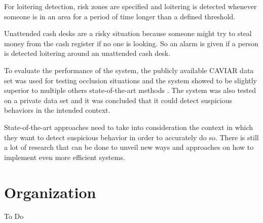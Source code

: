 For loitering detection, risk zones are specified and loitering is detected whenever someone is in an area for a period of time longer than a defined threshold.

Unattended cash desks are a risky situation because someone might try to steal money from the cash register if no one is looking. So an alarm is given if a person is detected loitering around an unattended cash desk.

To evaluate the performance of the system, the publicly available CAVIAR data set was used for testing occlusion situations and the system showed to be slightly superior to multiple others state-of-the-art methods \cite{n13,n14,n15}. The system was also tested on a private data set and it was concluded that it could detect suspicious behaviors in the intended context.

State-of-the-art approaches need to take into consideration the context in which they want to detect suspicious behavior in order to accurately do so. There is still a lot of research that can be done to unveil new ways and approaches on how to implement even more efficient systems.


\section{Organization}
To Do


